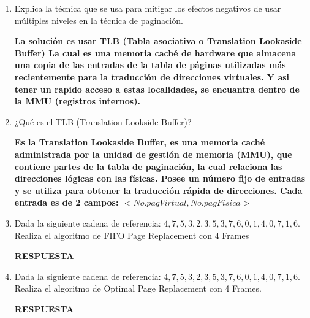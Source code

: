\documentclass[12pt]{article}
\begin{document}
\begin{enumerate}
    \item Explica la técnica que se usa para mitigar los efectos negativos de usar múltiples niveles en la técnica de paginación.
    \vspace{2mm}
    
    \textbf{La solución es usar TLB (Tabla asociativa o Translation Lookaside Buffer) La cual es una memoria caché de hardware que almacena una copia de las entradas de la tabla de páginas utilizadas más recientemente para la traducción de direcciones virtuales.
    Y asi tener un rapido acceso a estas localidades, se encuantra dentro de la MMU (registros internos).}

    \item ¿Qué es el TLB (Translation Lookside Buffer)?
    \vspace{2mm}
    
    \textbf{Es la Translation Lookaside Buffer, es una memoria caché administrada por la unidad de gestión de memoria (MMU), que contiene partes de la tabla de paginación, la cual relaciona las direcciones lógicas con las físicas. Posee un número fijo de entradas y se utiliza para obtener la traducción rápida de direcciones.
    Cada entrada es de 2 campos: $<No.pagVirtual, No.pagFisica>$}

    \item Dada la siguiente cadena de referencia: $4,7,5,3,2,3,5,3,7,6,0,1,4,0,7,1,6.$ Realiza el algoritmo de FIFO Page Replacement con 4 Frames
    \vspace{2mm}
    
    \textbf{RESPUESTA}

    \item Dada la siguiente cadena de referencia: $4,7,5,3,2,3,5,3,7,6,0,1,4,0,7,1,6.$ Realiza el algoritmo de Optimal Page Replacement con 4 Frames.
    \vspace{2mm}
    
    \textbf{RESPUESTA}

\end{enumerate}
\end{document}
